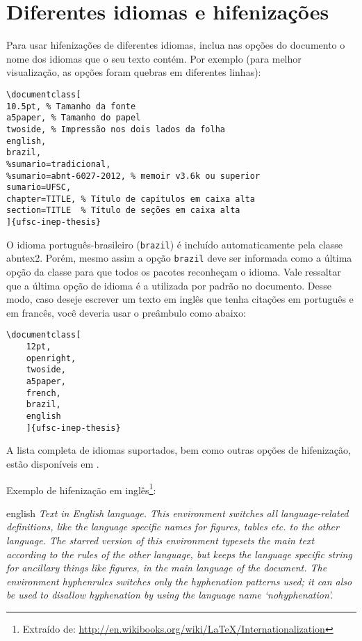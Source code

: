 \section{Diferentes idiomas e hifenizações}
\label{sec-hifenizacao}

Para usar hifenizações de diferentes idiomas, inclua nas opções do documento o
nome dos idiomas que o seu texto contém. Por exemplo (para melhor
visualização, as opções foram quebras em diferentes linhas):

\begin{verbatim}
\documentclass[
10.5pt, % Tamanho da fonte
a5paper, % Tamanho do papel
twoside, % Impressão nos dois lados da folha
english,
brazil,
%sumario=tradicional,
%sumario=abnt-6027-2012, % memoir v3.6k ou superior
sumario=UFSC,
chapter=TITLE, % Título de capítulos em caixa alta
section=TITLE  % Título de seções em caixa alta
]{ufsc-inep-thesis}
\end{verbatim}

O idioma português-brasileiro (\texttt{brazil}) é incluído automaticamente pela
classe \textsf{abntex2}. Porém, mesmo assim a opção \texttt{brazil} deve ser
informada como a última opção da classe para que todos os pacotes reconheçam o
idioma. Vale ressaltar que a última opção de idioma é a utilizada por padrão no
documento. Desse modo, caso deseje escrever um texto em inglês que tenha
citações em português e em francês, você deveria usar o preâmbulo como abaixo:

\begin{verbatim}
\documentclass[
	12pt,
	openright,
	twoside,
	a5paper,
	french,
	brazil,
	english
	]{ufsc-inep-thesis}
\end{verbatim}

A lista completa de idiomas suportados, bem como outras opções de hifenização,
estão disponíveis em .

Exemplo de hifenização em inglês\footnote{Extraído de:
\url{http://en.wikibooks.org/wiki/LaTeX/Internationalization}}:

\begin{otherlanguage*}{english}
\textit{Text in English language. This environment switches all language-related
definitions, like the language specific names for figures, tables etc. to the other
language. The starred version of this environment typesets the main text
according to the rules of the other language, but keeps the language specific
string for ancillary things like figures, in the main language of the document.
The environment hyphenrules switches only the hyphenation patterns used; it can
also be used to disallow hyphenation by using the language name
`nohyphenation'.}
\end{otherlanguage*}

